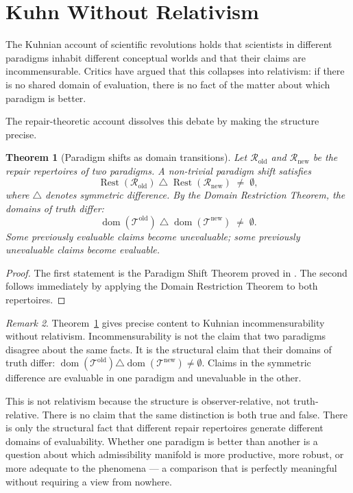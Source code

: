 \documentclass[12pt, oneside]{article}
\theoremstyle{plain}
\newtheorem{theorem}{Theorem}[section]
\theoremstyle{definition}
\theoremstyle{remark}
\newtheorem{remark}[theorem]{Remark}
\DeclareMathOperator{\Rest}{Rest}
\newcommand{\Tsub}{\mathcal{T}}
\begin{document}
\section{Kuhn Without Relativism}
\label{sec:kuhn}

The Kuhnian account of scientific revolutions holds that scientists
in different paradigms inhabit different conceptual worlds and that
their claims are incommensurable.
Critics have argued that this collapses into relativism: if there
is no shared domain of evaluation, there is no fact of the matter
about which paradigm is better.

The repair-theoretic account dissolves this debate by making the
structure precise.

\begin{theorem}[Paradigm shifts as domain transitions]
  Let $\mathcal{R}_{\text{old}}$ and $\mathcal{R}_{\text{new}}$
  be the repair repertoires of two paradigms.
  A non-trivial paradigm shift satisfies
  \[
    \Rest(\mathcal{R}_{\text{old}})
    \;\triangle\;
    \Rest(\mathcal{R}_{\text{new}})
    \;\neq\; \emptyset,
  \]
  where $\triangle$ denotes symmetric difference.
  By the Domain Restriction Theorem, the domains of truth differ:
  \[
    \operatorname{dom}(\Tsub^{\text{old}})
    \;\triangle\;
    \operatorname{dom}(\Tsub^{\text{new}})
    \;\neq\; \emptyset.
  \]
  Some previously evaluable claims become unevaluable;
  some previously unevaluable claims become evaluable.
  \label{thm:paradigm-shift}
\end{theorem}

\begin{proof}
  The first statement is the Paradigm Shift Theorem proved in
  \cite{Flyxion2026a}.
  The second follows immediately by applying the Domain Restriction
  Theorem to both repertoires.
\end{proof}

\begin{remark}
  Theorem~\ref{thm:paradigm-shift} gives precise content to
  Kuhnian incommensurability without relativism.
  Incommensurability is not the claim that two paradigms disagree
  about the same facts.
  It is the structural claim that their domains of truth differ:
  $\operatorname{dom}(\Tsub^{\text{old}}) \triangle
  \operatorname{dom}(\Tsub^{\text{new}}) \neq \emptyset$.
  Claims in the symmetric difference are evaluable in one paradigm
  and unevaluable in the other.

  This is not relativism because the structure is observer-relative,
  not truth-relative.
  There is no claim that the same distinction is both true and false.
  There is only the structural fact that different repair repertoires
  generate different domains of evaluability.
  Whether one paradigm is better than another is a question about
  which admissibility manifold is more productive, more robust,
  or more adequate to the phenomena — a comparison that is
  perfectly meaningful without requiring a view from nowhere.
\end{remark}
\end{document}
